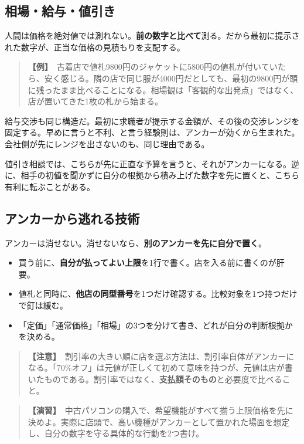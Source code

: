 \documentclass{article}
\begin{document}
\subsection{相場・給与・値引き}

人間は価格を絶対値では測れない。\textbf{前の数字と比べて}測る。だから最初に提示された数字が、正当な価格の見積もりを支配する。

\begin{quote}
\textbf{【例】}\ 古着店で値札9800円のジャケットに5800円の値札が付いていたら、安く感じる。隣の店で同じ服が4000円だとしても、最初の9800円が頭に残ったまま比べることになる。相場観は「客観的な出発点」ではなく、店が置いてきた1枚の札から始まる。
\end{quote}

給与交渉も同じ構造だ。最初に求職者が提示する金額が、その後の交渉レンジを固定する。早めに言うと不利、と言う経験則は、アンカーが効くから生まれた。会社側が先にレンジを出さないのも、同じ理由である。

値引き相談では、こちらが先に正直な予算を言うと、それがアンカーになる。逆に、相手の初値を聞かずに自分の根拠から積み上げた数字を先に置くと、こちら有利に転ぶことがある。

\subsection{アンカーから逃れる技術}

アンカーは消せない。消せないなら、\textbf{別のアンカーを先に自分で置く}。

\begin{itemize}
\item 買う前に、\textbf{自分が払ってよい上限}を1行で書く。店を入る前に書くのが肝要。
\item 値札と同時に、\textbf{他店の同型番号}を1つだけ確認する。比較対象を1つ持つだけで釘は緩む。
\item 「定価」「通常価格」「相場」の3つを分けて書き、どれが自分の判断根拠かを決める。
\end{itemize}

\begin{quote}
\textbf{【注意】}\ 割引率の大きい順に店を選ぶ方法は、割引率自体がアンカーになる。「70\%オフ」は元値が正しくて初めて意味を持つが、元値は店が書いたものである。割引率ではなく、\textbf{支払額そのもの}と必要度で比べること。
\end{quote}

\begin{quote}
\textbf{【演習】}\ 中古パソコンの購入で、希望機能がすべて揃う上限価格を先に決めよ。実際に店頭で、高い機種がアンカーとして置かれた場面を想定し、自分の数字を守る具体的な行動を2つ書け。
\end{quote}
\end{document}
